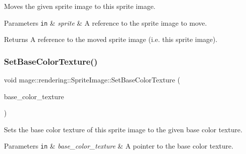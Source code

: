 Moves the given sprite image to this sprite image.


\begin{DoxyParams}[1]{Parameters}
\mbox{\tt in}  & {\em sprite} & A reference to the sprite image to move. \\
\hline
\end{DoxyParams}
\begin{DoxyReturn}{Returns}
A reference to the moved sprite image (i.\+e. this sprite image). 
\end{DoxyReturn}
\mbox{\label{classmage_1_1rendering_1_1_sprite_image_a363b30407434dea9d3069142ff8c4059}} 
\subsubsection{\texorpdfstring{Set\+Base\+Color\+Texture()}{SetBaseColorTexture()}}
{\footnotesize\ttfamily void mage\+::rendering\+::\+Sprite\+Image\+::\+Set\+Base\+Color\+Texture (\begin{DoxyParamCaption}\item[{\mbox{\hyperlink{namespacemage_1_1rendering_a6f3ae54f825328465b0cdde0f0de4a36}{Texture\+Ptr}}}]{base\+\_\+color\+\_\+texture }\end{DoxyParamCaption})\hspace{0.3cm}{\ttfamily [noexcept]}}

Sets the base color texture of this sprite image to the given base color texture.


\begin{DoxyParams}[1]{Parameters}
\mbox{\tt in}  & {\em base\+\_\+color\+\_\+texture} & A pointer to the base color texture. \\
\hline
\end{DoxyParams}
\mbox{\label{classmage_1_1rendering_1_1_sprite_image_a54b349a9f73c7d6f3ded4a3d1f3172bf}} 
